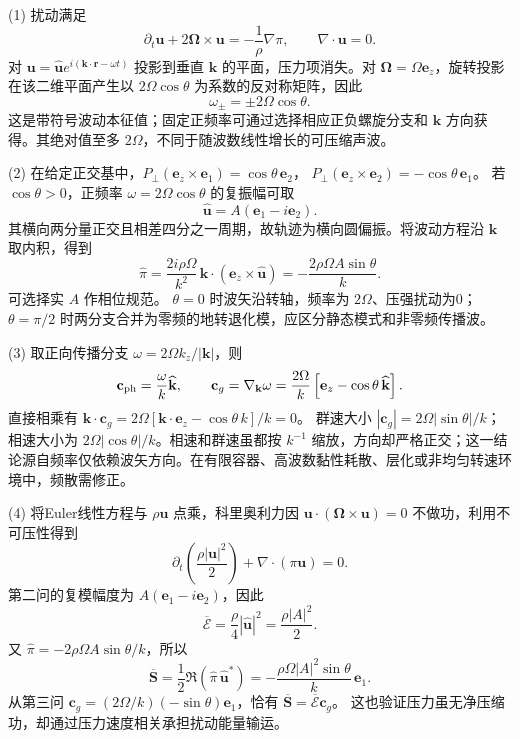 (1) 扰动满足
\[
\partial_t\mathbf u+2\boldsymbol\Omega\times\mathbf u=-\frac1\rho\nabla\pi,
\qquad\nabla\cdot\mathbf u=0.
\]
对 \(\mathbf u=\widehat{\mathbf u}e^{i(\mathbf k\cdot\mathbf r-\omega t)}\) 投影到垂直 \(\mathbf k\) 的平面，压力项消失。对 \(\boldsymbol\Omega=\Omega\mathbf e_z\)，旋转投影在该二维平面产生以 \(2\Omega\cos\theta\) 为系数的反对称矩阵，因此
\[
\boxed{\omega_\pm=\pm2\Omega\cos\theta}.
\]
这是带符号波动本征值；固定正频率可通过选择相应正负螺旋分支和 \(\mathbf k\) 方向获得。其绝对值至多 \(2\Omega\)，不同于随波数线性增长的可压缩声波。

(2) 在给定正交基中，\(P_\perp(\mathbf e_z\times\mathbf e_1)=\cos\theta\,\mathbf e_2\)，
\(P_\perp(\mathbf e_z\times\mathbf e_2)=-\cos\theta\,\mathbf e_1\)。
若 \(\cos\theta>0\)，正频率 \(\omega=2\Omega\cos\theta\) 的复振幅可取
\[
\widehat{\mathbf u}=A(\mathbf e_1-i\mathbf e_2).
\]
其横向两分量正交且相差四分之一周期，故轨迹为横向圆偏振。将波动方程沿 \(\mathbf k\) 取内积，得到
\[
\widehat\pi=\frac{2i\rho\Omega}{k^2}\,
\mathbf k\cdot(\mathbf e_z\times\widehat{\mathbf u})
=-\frac{2\rho\Omega A\sin\theta}{k}.
\]
可选择实 \(A\) 作相位规范。 \(\theta=0\) 时波矢沿转轴，频率为 \(2\Omega\)、压强扰动为0；\(\theta=\pi/2\) 时两分支合并为零频的地转退化模，应区分静态模式和非零频传播波。

(3) 取正向传播分支 \(\omega=2\Omega k_z/|\mathbf k|\)，则
\[
\mathbf c_{\rm ph}=\frac{\omega}{k}\widehat{\mathbf k},
\qquad
\mathbf c_g=\nabla_{\mathbf k}\omega
=\frac{2\Omega}{k}\left[\mathbf e_z-\cos\theta\,\widehat{\mathbf k}\right].
\]
直接相乘有
\(\mathbf k\cdot\mathbf c_g=2\Omega[\mathbf k\cdot\mathbf e_z-\cos\theta\,k]/k=0\)。
群速大小 \(|\mathbf c_g|=2\Omega|\sin\theta|/k\)；相速大小为 \(2\Omega|\cos\theta|/k\)。相速和群速虽都按 \(k^{-1}\) 缩放，方向却严格正交；这一结论源自频率仅依赖波矢方向。在有限容器、高波数黏性耗散、层化或非均匀转速环境中，频散需修正。

(4) 将Euler线性方程与 \(\rho\mathbf u\) 点乘，科里奥利力因
\(\mathbf u\cdot(\boldsymbol\Omega\times\mathbf u)=0\) 不做功，利用不可压性得到
\[
\partial_t\left(\frac{\rho|\mathbf u|^2}{2}\right)
+\nabla\cdot(\pi\mathbf u)=0.
\]
第二问的复模幅度为 \(A(\mathbf e_1-i\mathbf e_2)\)，因此
\[
\overline{\mathcal E}=\frac{\rho}{4}|\widehat{\mathbf u}|^2
=\frac{\rho|A|^2}{2}.
\]
又 \(\widehat\pi=-2\rho\Omega A\sin\theta/k\)，所以
\[
\overline{\mathbf S}=\frac12\Re(\widehat\pi\,\widehat{\mathbf u}^*)
=-\frac{\rho\Omega|A|^2\sin\theta}{k}\,\mathbf e_1.
\]
从第三问
\(\mathbf c_g=(2\Omega/k)(-\sin\theta)\mathbf e_1\)，恰有
\(\overline{\mathbf S}=\overline{\mathcal E}\mathbf c_g\)。
这也验证压力虽无净压缩功，却通过压力速度相关承担扰动能量输运。
